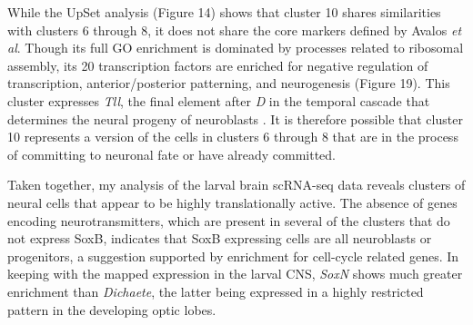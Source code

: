 \documentclass[withindex,glossary]{cam-thesis}
\begin{document}
While the UpSet analysis (Figure 14) shows that cluster 10 shares
similarities with clusters 6 through 8, it does not share the core
markers defined by Avalos \emph{et al}. Though its full GO enrichment is
dominated by processes related to ribosomal assembly, its 20
transcription factors are enriched for negative regulation of
transcription, anterior/posterior patterning, and neurogenesis (Figure
19). This cluster expresses \emph{Tll}, the final element after \emph{D}
in the temporal cascade that determines the neural progeny of
neuroblasts . It is therefore possible that cluster
10 represents a version of the cells in clusters 6 through 8 that are in
the process of committing to neuronal fate or have already committed.

Taken together, my analysis of the larval brain scRNA-seq data reveals
clusters of neural cells that appear to be highly translationally
active. The absence of genes encoding neurotransmitters, which are
present in several of the clusters that do not express SoxB, indicates
that SoxB expressing cells are all neuroblasts or progenitors, a
suggestion supported by enrichment for cell-cycle related genes. In
keeping with the mapped expression in the larval CNS, \emph{SoxN} shows
much greater enrichment than \emph{Dichaete}, the latter being expressed
in a highly restricted pattern in the developing optic lobes.
\end{document}
